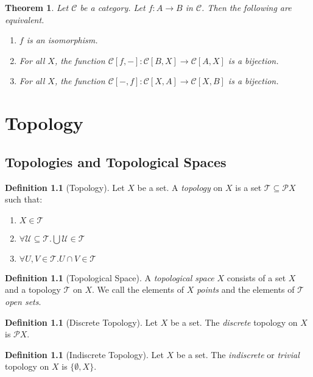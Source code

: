 \documentclass{book}
\newtheorem{theorem}[lemma]{Theorem}
\theoremstyle{definition}
\newtheorem{definition}[lemma]{Definition}
\newcommand{\CC}{\ensuremath{\mathcal{C}}}
\newcommand{\PP}{\ensuremath{\mathcal{P}}}
\newcommand{\TT}{\ensuremath{\mathcal{T}}}
\newcommand{\pow}[1]{\ensuremath{\PP {#1}}}
\begin{document}
\begin{theorem}
    Let $\CC$ be a category. Let $f : A \rightarrow B$ in $\CC$. Then the following are equivalent.
    \begin{enumerate}
        \item $f$ is an isomorphism.
        \item For all $X$, the function $\CC[f,-] : \CC[B,X] \rightarrow \CC[A,X]$ is a bijection.
        \item For all $X$, the function $\CC[-,f] : \CC[X,A] \rightarrow \CC[X,B]$ is a bijection.
    \end{enumerate}
\end{theorem}

\chapter{Topology}

\section{Topologies and Topological Spaces}

\begin{definition}[Topology]
    Let $X$ be a set. A \emph{topology} on $X$ is a set $\TT \subseteq \pow{X}$
    such that:
    \begin{enumerate}
        \item $X \in \TT$
        \item $\forall \mathcal{U} \subseteq \TT. \bigcup \mathcal{U} \in \TT$
        \item $\forall U,V \in \TT. U \cap V \in \TT$
    \end{enumerate}
\end{definition}

\begin{definition}[Topological Space]
    A \emph{topological space} $X$ consists of a set $X$ and a topology $\TT$ on $X$.
    We call the elements of $X$ \emph{points} and the elements of $\TT$ \emph{open sets}.
\end{definition}

\begin{definition}[Discrete Topology]
    Let $X$ be a set. The \emph{discrete} topology on $X$ is $\pow{X}$.
\end{definition}

\begin{definition}[Indiscrete Topology]
    Let $X$ be a set. The \emph{indiscrete} or \emph{trivial} topology on $X$ is $\{ \emptyset, X \}$.
\end{definition}
\end{document}
